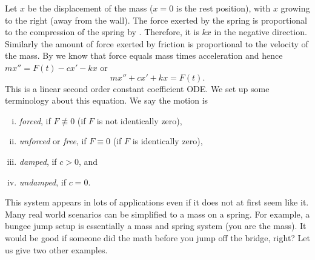 \documentclass[12pt]{book}
\begin{document}
Let $x$ be the displacement of the mass ($x=0$ is the rest position), with
$x$ growing to the right (away from the wall).
The force exerted by the spring is proportional to the
compression of the spring by .
Therefore, it is $kx$ in the negative direction.
Similarly the amount of force exerted by friction is proportional
to the velocity of the mass.
By  we know that force equals mass times acceleration
and hence $mx'' = F(t)-cx'-kx$ or
\begin{equation*}
mx'' + cx' + kx = F(t) .
\end{equation*}
This is a linear second order constant coefficient ODE.  We set up some
terminology about this equation.  We say the motion is
\vspace*{0.5\baselineskip}
\begin{enumerate}[(i)]
\item \emph{forced}, if $F \not\equiv 0$ (if $F$ is not identically zero),
\item \emph{unforced} or \emph{free}, if $F \equiv 0$ (if $F$ is identically zero),
\item \emph{damped}, if $c > 0$, and
\item \emph{undamped}, if $c = 0$.
\end{enumerate}

This system appears in lots of applications even if it does not at first
seem like it.  Many real world scenarios can be simplified to
a mass on a spring.  For example, a bungee jump setup is essentially a mass
and spring system (you are the mass).  It would be good if someone did the math
before you jump off the bridge, right?  Let us give two other examples.

\medskip
\end{document}
